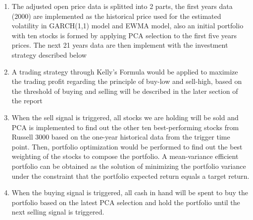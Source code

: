 \documentclass[11pt,a4paper]{article}
\begin{document}
    \begin{enumerate}
        \item The adjusted open price data is splitted into 2 parts, the first years data (2000) are implemented as the historical price used for the estimated volatility in GARCH(1,1) model and EWMA model, also an initial portfolio with ten stocks is formed by applying PCA selection to the first five years prices. The next 21 years data are then implement with the investment strategy described below
        \item A trading strategy through Kelly's Formula would be applied to maximize the trading profit regarding the principle of buy-low and sell-high, based on the threshold of buying and selling will be described in the later section of the report
        \item When the sell signal is triggered, all stocks we are holding will be sold and PCA is implemented to find out the other ten best-performing stocks from Russell 3000 based on the one-year historical data from the trigger time point. Then, portfolio optimization would be performed to find out the best weighting of the stocks to compose the portfolio. A mean-variance efficient portfolio can be obtained as the solution of minimizing the portfolio variance under the constraint that the portfolio expected return equals a target return.
        \item When the buying signal is triggered, all cash in hand will be spent to buy the portfolio based on the latest PCA selection and hold the portfolio until the next selling signal is triggered.
    \end{enumerate}
    
\end{document}
